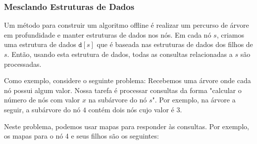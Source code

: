 \subsubsection{Mesclando Estruturas de Dados}

Um método para construir um algoritmo offline é realizar um percurso de árvore em profundidade e manter estruturas de dados nos nós. Em cada nó $s$, criamos uma estrutura de dados $\texttt{d}[s]$ que é baseada nas estruturas de dados dos filhos de $s$. Então, usando esta estrutura de dados, todas as consultas relacionadas a $s$ são processadas.

Como exemplo, considere o seguinte problema: Recebemos uma árvore onde cada nó possui algum valor. Nossa tarefa é processar consultas da forma "calcular o número de nós com valor $x$ na subárvore do nó $s$". Por exemplo, na árvore a seguir, a subárvore do nó $4$ contém dois nós cujo valor é 3.

\begin{center}
\end{center}

Neste problema, podemos usar mapas para responder às consultas. Por exemplo, os mapas para o nó 4 e seus filhos são os seguintes:

